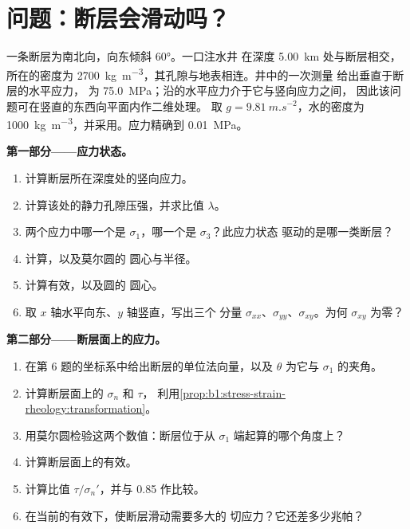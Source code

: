 \section{问题：断层会滑动吗？}

\begin{problem}
\label{pb:b1:stress-strain-rheology:1}
 一条断层为南北向，向东倾斜 \ang{60}。一口注水井
 在深度 \qty{5.00}{km} 处与断层相交，所在的密度为
 \qty{2700}{kg.m^{-3}}，其孔隙与地表相连。井中的一次测量
 给出垂直于断层的水平应力，
 为 \qty{75.0}{MPa}；沿的水平应力介于它与竖向应力之间，
 因此该问题可在竖直的东西向平面内作二维处理。
 取 $g = \qty{9.81}{m.s^{-2}}$，水的密度为
 \qty{1000}{kg.m^{-3}}，并采用。应力精确到
 \qty{0.01}{MPa}。

\medskip
\noindent\textbf{第一部分——应力状态。}
\begin{enumerate}
  \item 计算断层所在深度处的竖向应力。
  \item 计算该处的静力孔隙压强，并求比值 $\lambda$。
  \item 两个应力中哪一个是 $\sigma_1$，哪一个是 $\sigma_3$？此应力状态
        驱动的是哪一类断层？
  \item 计算，以及莫尔圆的
        圆心与半径。
  \item 计算有效，以及圆的
        圆心。
  \item 取 $x$ 轴水平向东、$y$ 轴竖直，写出三个
        分量 $\sigma_{xx}$、$\sigma_{yy}$、$\sigma_{xy}$。为何
        $\sigma_{xy}$ 为零？
\end{enumerate}

\medskip
\noindent\textbf{第二部分——断层面上的应力。}
\begin{enumerate}[resume]
  \item 在第 6 题的坐标系中给出断层的单位法向量，以及
        $\theta$ 为它与 $\sigma_1$ 的夹角。
  \item 计算断层面上的 $\sigma_n$ 和 $\tau$，
        利用\cref{prop:b1:stress-strain-rheology:transformation}。
  \item 用莫尔圆检验这两个数值：断层位于从 $\sigma_1$
        端起算的哪个角度上？
  \item 计算断层面上的有效。
  \item 计算比值 $\tau/\sigma_n'$，并与 0.85 作比较。
  \item 在当前的有效下，使断层滑动需要多大的
        切应力？它还差多少兆帕？
\end{enumerate}


\end{problem}
